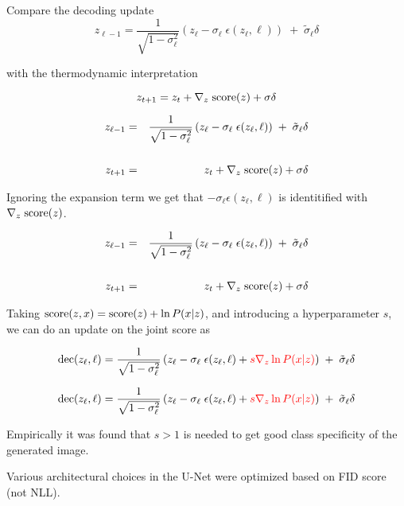 {Compare the decoding update
$$z_{\ell-1} = \frac{1}{\sqrt{1-\sigma_\ell^2}}\left(z_\ell - \sigma_\ell\; \epsilon(z_\ell,\ell) \right)\; +\; \tilde{\sigma}_\ell\delta$$

\vfill
with the thermodynamic interpretation

$$z_{t+1} = z_t + \nabla_z \;\mathrm{score}(z) + \sigma \delta$$


\begin{eqnarray*}
  z_{\ell-1} & = & \frac{1}{\sqrt{1-\sigma_\ell^2}}\left(z_\ell - \sigma_\ell\; \epsilon(z_\ell,\ell) \right)\; +\; \tilde{\sigma}_\ell\delta \\
  \\
  z_{t+1} & = & z_t + \nabla_z\; \mathrm{score}(z) + \sigma \delta
\end{eqnarray*}


\vfill
Ignoring the expansion term we get that $- \sigma_\ell \epsilon(z_\ell,\ell)$ is identitified with $\nabla_z\; \mathrm{score}(z)$.

\begin{eqnarray*}
  z_{\ell-1} & = & \frac{1}{\sqrt{1-\sigma_\ell^2}}\left(z_\ell - \sigma_\ell\; \epsilon(z_\ell,\ell) \right)\; +\; \tilde{\sigma}_\ell\delta \\
  \\
  z_{t+1} & = & z_t + \nabla_z\; \mathrm{score}(z) + \sigma \delta
\end{eqnarray*}


\vfill

\vfill
Taking $\mathrm{score}(z,x) = \mathrm{score}(z) + \ln P(x|z)$, and introducing a hyperparameter $s$, we can do an update on the joint score as


$$\mathrm{dec}(z_\ell,\ell) = \frac{1}{\sqrt{1-\sigma_\ell^2}}\left(z_\ell - \sigma_\ell\; \epsilon(z_\ell,\ell) + {\color{red} s \nabla_{z} \ln P(x|z)}\right)\; +\; \tilde{\sigma}_\ell\delta$$



$$\mathrm{dec}(z_\ell,\ell) = \frac{1}{\sqrt{1-\sigma_\ell^2}}\left(z_\ell - \sigma_\ell\; \epsilon(z_\ell,\ell) + {\color{red} s \nabla_{z} \ln P(x|z)}\right)\; +\; \tilde{\sigma}_\ell\delta$$

\vfill
Empirically it was found that $s > 1$ is needed to get good class specificity of the generated image.


Various architectural choices in the U-Net were optimized based on FID score (not NLL).

}
